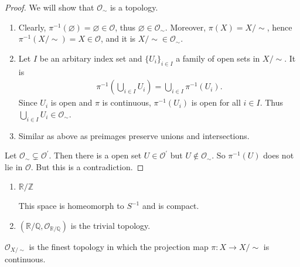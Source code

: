 \begin{proof}
    We will show that \(\mathcal{O}_\sim\) is a topology.
    \begin{enumerate}
        \item Clearly, \(\pi^{-1}(\varnothing) = \varnothing \in \mathcal{O}\), thus \(\varnothing \in \mathcal{O}_\sim\). Moreover, \(\pi(X) = X / \sim\), hence \(\pi^{-1}(X / \sim) = X \in \mathcal{O}\), and it is \(X / \sim \in \mathcal{O}_\sim\).
        \item Let \(I\) be an arbitary index set and \(\{U_i\}_{i \in I}\) a family of open sets in \(X / \sim\). It is
        \begin{align}
            \pi^{-1}\left( \bigcup_{i \in I} U_i \right) = \bigcup_{i \in I} \pi^{-1}(U_i) \text{.}
        \end{align}
        Since \(U_i\) is open and \(\pi\) is continuous, \(\pi^{-1}(U_i)\) is open for all \(i \in I\). Thus \(\bigcup_{i \in I} U_i \in \mathcal{O}_\sim\).
        \item Similar as above as preimages preserve unions and intersections.
    \end{enumerate}
    Let \(\mathcal{O}_\sim \subsetneq \mathcal{O}^\prime\). Then there is a open set \(U \in \mathcal{O}^\prime\) but \(U \not\in \mathcal{O}_\sim\). So \(\pi^{-1}(U)\) does not lie in \(\mathcal{O}\). But this is a contradiction.
\end{proof}
%
\begin{exmbox}
    \begin{example}
        \begin{enumerate}
            \item \(\mathbb{R} / \mathbb{Z}\)

            This space is homeomorph to \(S^{-1}\) and is compact.
            \item \((\mathbb{R} / \mathbb{Q}, \mathcal{O}_{\mathbb{R} / \mathbb{Q}})\) is the trivial topology.
        \end{enumerate}
    \end{example}
\end{exmbox}
%
\begin{thmbox}
    \begin{proposition}
        \(\mathcal{O}_{X / \sim}\) is the {\color{maththen}finest} {\color{mathobj}topology} in which the {\color{mathif}projection map} \(\pi: X \longrightarrow X / \sim\) is {\color{mathif}continuous}.
    \end{proposition}
\end{thmbox}
